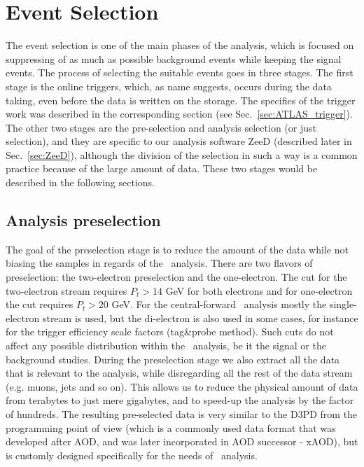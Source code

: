 \chapter{Event Selection}
\label{sec:Selection}

The event selection is one of the main phases of the analysis, which is focused on suppressing of as much as possible background events while keeping the signal events. The process of selecting the suitable events goes in three stages. The first stage is the online triggers, which, as name suggests, occurs during the data taking, even before the data is written on the storage. The specifies of the trigger work was described in the corresponding section (see Sec.~\ref{sec:ATLAS_trigger}). The other two stages are the pre-selection and analysis selection (or just selection), and they are specific to our analysis software ZeeD (described later in Sec.~\ref{sec:ZeeD}), although the division of the selection in such a way is a common practice because of the large amount of data. These two stages would be described in the following sections.

\section{Analysis preselection}
\label{sec:Sel_pre-sel}

The goal of the preselection stage is to reduce the amount of the data while not biasing the samples in regards of the \Zee\ analysis. There are two flavors of preselection: the two-electron preselection and the one-electron. The cut for the two-electron stream requires $P_{t} > 14$ GeV for both electrons and for one-electron the cut requires $P_{t} > 20$ GeV. For the central-forward \Zee\ analysis mostly the single-electron stream is used, but the di-electron is also used in some cases, for instance for the trigger efficiency scale factors (tag\&probe method). Such cuts do not affect any possible distribution within the \Zee\ analysis, be it the signal or the background studies. During the preselection stage we also extract all the data that is relevant to the analysis, while disregarding all the rest of the data stream (e.g. muons, jets and so on). This allows us to reduce the physical amount of data from terabytes to just mere gigabytes, and to speed-up the analysis by the factor of hundreds. The resulting pre-selected data is very similar to the D3PD from the programming point of view (which is a commonly used data format that was developed after AOD, and was later incorporated in AOD successor - xAOD), but is customly designed specifically for the needs of \Zee\ analysis.

